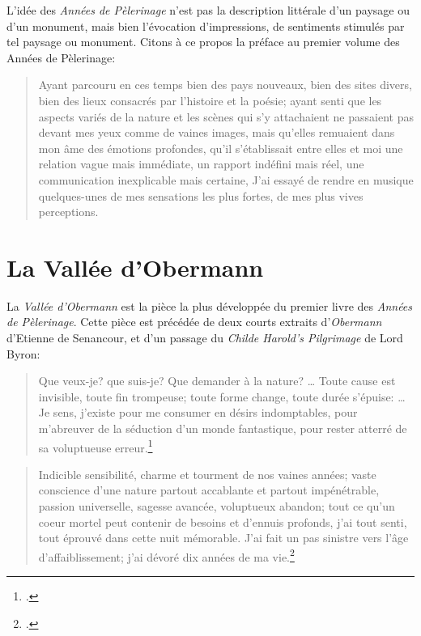 \documentclass[11pt,a4paper]{scrartcl}
\begin{document}
L'idée des \emph{Années de Pèlerinage} n'est pas la description littérale d'un paysage ou d'un monument, mais bien l'évocation
d'impressions, de sentiments stimulés par tel paysage ou monument. Citons à ce propos la préface au premier volume
des Années de Pèlerinage:
\begin{quote}
Ayant parcouru en ces temps bien des pays nouveaux, bien des sites divers, bien des
lieux consacrés par l'histoire et la poésie; ayant senti que les aspects variés de la nature et les scènes qui s'y 
attachaient ne passaient pas devant mes yeux comme de vaines images, mais qu'elles remuaient dans mon âme
des émotions profondes, qu'il s'établissait entre elles et moi une relation vague mais immédiate, un rapport
indéfini mais réel, une communication inexplicable mais certaine, J'ai essayé de rendre en musique
quelques-unes de mes sensations les plus fortes, de mes plus vives perceptions.
\end{quote}


\section{La Vallée d'Obermann}


La \emph{Vallée d'Obermann} est la pièce la plus développée du premier livre des \emph{Années de Pèlerinage}.
Cette pièce est précédée de deux courts extraits d'\emph{Obermann} d'Etienne de Senancour, et d'un passage du
\emph{Childe Harold's Pilgrimage} de Lord Byron:
\begin{quote}
Que veux-je? que suis-je? Que demander à la nature? \ldots{} Toute cause est invisible, toute fin trompeuse;
toute forme change, toute durée s'épuise: \ldots{} Je sens, j'existe pour me consumer en désirs indomptables,
pour m'abreuver de la séduction d'un monde fantastique, pour rester atterré de sa voluptueuse erreur.\footcite[Lettre 63 \emph{in}][]{senancour1984}
\end{quote}


\begin{quote}Indicible sensibilité, charme et tourment de nos vaines années; vaste conscience d'une nature partout accablante
et partout impénétrable, passion universelle, sagesse avancée, voluptueux abandon; tout
ce qu'un coeur mortel peut contenir de besoins et d'ennuis profonds, j'ai tout senti, tout éprouvé dans cette nuit mémorable.
J'ai fait un pas sinistre vers l'âge d'affaiblissement; j'ai dévoré dix années de ma vie.\footcite[Lettre 4 \emph{in}][]{senancour1984}\end{quote}
\end{document}
